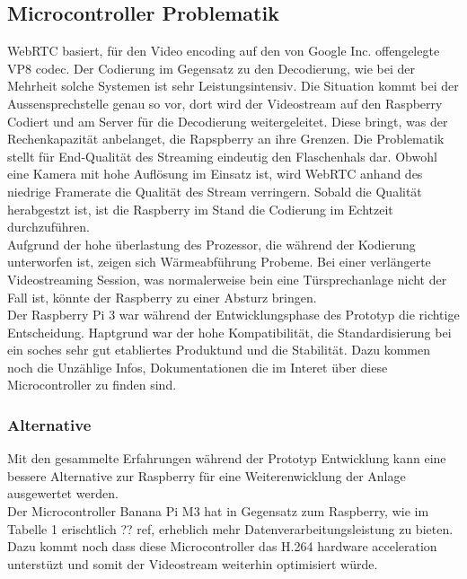 \subsection{Microcontroller Problematik}
\label{sec:microcontroller}
WebRTC basiert, für den Video encoding auf den von Google Inc. offengelegte VP8 codec. Der Codierung im Gegensatz zu den Decodierung, wie bei der Mehrheit solche Systemen ist sehr Leistungsintensiv. Die Situation kommt bei der Aussensprechstelle genau so vor, dort wird der Videostream auf den Raspberry Codiert und am Server für die Decodierung weitergeleitet. Diese bringt, was der Rechenkapazität anbelanget,  die Rapspberry  an ihre Grenzen. Die Problematik stellt für End-Qualität des Streaming eindeutig den Flaschenhals dar. Obwohl eine Kamera mit hohe Auflösung im Einsatz ist, wird WebRTC anhand des niedrige Framerate die Qualität des Stream verringern. Sobald die Qualität herabgestzt ist, ist die Raspberry im Stand die Codierung im Echtzeit durchzuführen.
\\
Aufgrund der hohe überlastung des Prozessor, die während der Kodierung unterworfen ist, zeigen sich Wärmeabführung Probeme. Bei einer verlängerte Videostreaming Session, was normalerweise bein eine Türsprechanlage nicht der Fall ist, könnte der Raspberry zu einer Absturz bringen. 
\\
Der Raspberry Pi 3 war während der Entwicklungsphase des Prototyp die richtige Entscheidung. Haptgrund war der hohe Kompatibilität, die Standardisierung bei ein soches sehr gut etabliertes Produktund und die Stabilität. Dazu kommen noch die Unzählige Infos, Dokumentationen die im Interet über diese Microcontroller zu finden sind.

\subsubsection{Alternative}
Mit den gesammelte Erfahrungen während der Prototyp Entwicklung kann eine bessere Alternative zur Raspberry für eine Weiterenwicklung der Anlage ausgewertet werden. 
\\
Der Microcontroller Banana Pi M3 hat in Gegensatz zum Raspberry, wie im Tabelle 1 erischtlich ?? ref, erheblich mehr Datenverarbeitungsleistung zu bieten. Dazu kommt noch dass diese Microcontroller das H.264 hardware acceleration unterstüzt und somit der Videostream weiterhin optimisiert würde.

